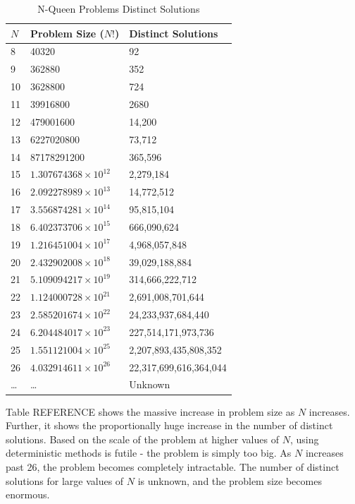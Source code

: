 \documentclass[conference]{IEEEtran}
\begin{document}
\begin{table}[h!]
\centering
\caption{N-Queen Problems Distinct Solutions}
\begin{tabular}{|l|l|l|} \hline
$N$  & Problem Size ($N!$)      & Distinct Solutions     \\ \hline
8  & 40320                      & 92                     \\
9  & 362880                     & 352                    \\
10 & 3628800                    & 724                    \\
11 & 39916800                   & 2680                   \\
12 & 479001600                  & 14,200                 \\
13 & 6227020800                 & 73,712                 \\
14 & 87178291200                & 365,596                \\
15 & $1.307674368\times10^{12}$ & 2,279,184              \\
16 & $2.092278989\times10^{13}$ & 14,772,512             \\
17 & $3.556874281\times10^{14}$ & 95,815,104             \\
18 & $6.402373706\times10^{15}$ & 666,090,624            \\
19 & $1.216451004\times10^{17}$ & 4,968,057,848          \\
20 & $2.432902008\times10^{18}$ & 39,029,188,884         \\
21 & $5.109094217\times10^{19}$ & 314,666,222,712        \\
22 & $1.124000728\times10^{21}$ & 2,691,008,701,644      \\
23 & $2.585201674\times10^{22}$ & 24,233,937,684,440     \\
24 & $6.204484017\times10^{23}$ & 227,514,171,973,736    \\
25 & $1.551121004\times10^{25}$ & 2,207,893,435,808,352  \\
26 & $4.032914611\times10^{26}$ & 22,317,699,616,364,044 \\
\dots & \dots & Unknown				\\
\hline\end{tabular}
\label{table:numuniquesol}
\end{table}


Table {REFERENCE} shows the massive increase in problem size as $N$ increases. Further, it shows the proportionally huge increase in the number of distinct solutions. Based on the scale of the problem at higher values of $N$, using deterministic methods is futile - the problem is simply too big. As $N$ increases past 26, the problem becomes completely intractable. The number of distinct solutions for large values of $N$ is unknown, and the problem size becomes enormous. 
\end{document}
